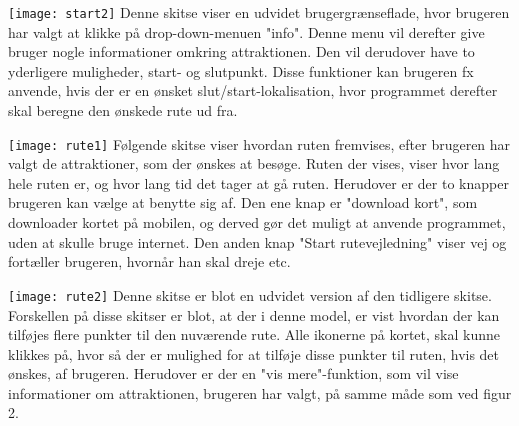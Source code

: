 \texttt{[image: start2]} \newline
Denne skitse viser en udvidet brugergrænseflade, hvor brugeren har valgt at klikke på drop-down-menuen "info". Denne menu vil derefter give bruger nogle informationer omkring attraktionen. Den vil derudover have to yderligere muligheder, start- og slutpunkt. Disse funktioner kan brugeren fx anvende, hvis der er en ønsket slut/start-lokalisation, hvor programmet derefter skal beregne den ønskede rute ud fra.


\texttt{[image: rute1]} \newline
Følgende skitse viser hvordan ruten fremvises, efter brugeren har valgt de attraktioner, som der ønskes at besøge. Ruten der vises, viser hvor lang hele ruten er, og hvor lang tid det tager at gå ruten. Herudover er der to knapper brugeren kan vælge at benytte sig af. Den ene knap er "download kort", som downloader kortet på mobilen, og derved gør det muligt at anvende programmet, uden at skulle bruge internet. Den anden knap "Start rutevejledning" viser vej og fortæller brugeren, hvornår han skal dreje etc. 


\texttt{[image: rute2]} \newline
Denne skitse er blot en udvidet version af den tidligere skitse. Forskellen på disse skitser er blot, at der i denne model, er vist hvordan der kan tilføjes flere punkter til den nuværende rute. Alle ikonerne på kortet, skal kunne klikkes på, hvor så der er mulighed for at tilføje disse punkter til ruten, hvis det ønskes, af brugeren. Herudover er der en "vis mere"-funktion, som vil vise informationer om attraktionen, brugeren har valgt, på samme måde som ved figur 2. 

